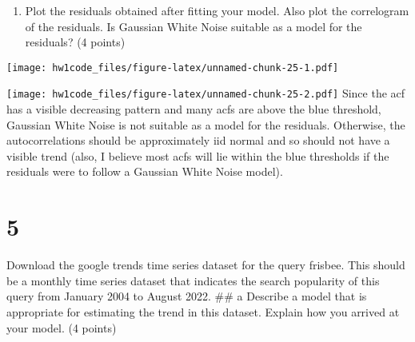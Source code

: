 \documentclass[
]{article}
\newenvironment{Shaded}{\begin{snugshade}}{\end{snugshade}}
\newcommand{\AttributeTok}[1]{\textcolor[rgb]{0.77,0.63,0.00}{#1}}
\newcommand{\FunctionTok}[1]{\textcolor[rgb]{0.00,0.00,0.00}{#1}}
\newcommand{\NormalTok}[1]{#1}
\newcommand{\SpecialCharTok}[1]{\textcolor[rgb]{0.00,0.00,0.00}{#1}}
\newcommand{\StringTok}[1]{\textcolor[rgb]{0.31,0.60,0.02}{#1}}
\providecommand{\tightlist}{%
  \setlength{\itemsep}{0pt}\setlength{\parskip}{0pt}}
\begin{document}
\begin{enumerate}
\def\labelenumi{\alph{enumi})}
\setcounter{enumi}{2}
\tightlist
\item
  Plot the residuals obtained after fitting your model. Also plot the
  correlogram of the residuals. Is Gaussian White Noise suitable as a
  model for the residuals? (4 points)
\end{enumerate}

\begin{Shaded}
\end{Shaded}

\texttt{[image: hw1code\_files/figure-latex/unnamed-chunk-25-1.pdf]}

\begin{Shaded}
\end{Shaded}

\texttt{[image: hw1code\_files/figure-latex/unnamed-chunk-25-2.pdf]}
Since the acf has a visible decreasing pattern and many acfs are above
the blue threshold, Gaussian White Noise is not suitable as a model for
the residuals. Otherwise, the autocorrelations should be approximately
iid normal and so should not have a visible trend (also, I believe most
acfs will lie within the blue thresholds if the residuals were to follow
a Gaussian White Noise model).

\hypertarget{section}{%
\section{5}\label{section}}

Download the google trends time series dataset for the query frisbee.
This should be a monthly time series dataset that indicates the search
popularity of this query from January 2004 to August 2022. \#\# a
Describe a model that is appropriate for estimating the trend in this
dataset. Explain how you arrived at your model. (4 points)
\end{document}
